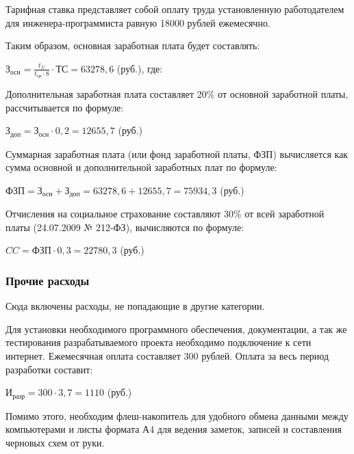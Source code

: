 Тарифная ставка представляет собой оплату труда установленную работодателем для инженера-программиста равную 18000 рублей ежемесячно.

Таким образом, основная заработная плата будет составлять:

\begin{center}
$ \text{З}_\text{осн} = \frac{t_\Sigma}{t_\text{ср} \cdot 8} \cdot ТС = 63278,6$ (руб.), где:
\end{center}

Дополнительная заработная плата составляет 20\% от основной заработной платы, рассчитывается по формуле:
\begin{center}
$ \text{З}_\text{доп} = \text{З}_\text{осн} \cdot 0,2 = 12655,7 $ (руб.)
\end{center}

Суммарная заработная плата (или фонд заработной платы, ФЗП) вычисляется как сумма основной и дополнительной заработных плат по формуле:

\begin{center}
$ \text{ФЗП} = \text{З}_\text{осн} + \text{З}_\text{доп} = 63278,6 + 12655,7 = 75934,3$ (руб.)
\end{center}

Отчисления на социальное страхование составляют 30\% от всей заработной платы (24.07.2009 № 212-ФЗ), вычисляются по формуле:

\begin{center}
$ CC = \text{ФЗП} \cdot 0,3 = 22780,3$ (руб.)
\end{center}

\subsubsection{Прочие расходы}
Сюда включены расходы, не попадающие в другие категории.

Для установки необходимого программного обеспечения, документации, а так же тестирования разрабатываемого проекта необходимо подключение к сети интернет. Ежемесячная оплата составляет 300 рублей. Оплата за весь период разработки составит:

\begin{center}
$ \text{И}_\text{разр} = 300 \cdot 3,7 = 1110$ (руб.)
\end{center}

Помимо этого, необходим флеш-накопитель для удобного обмена данными между компьютерами и листы формата А4 для ведения заметок, записей и составления черновых схем от руки.

